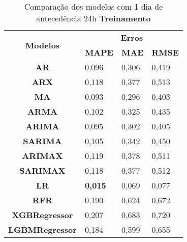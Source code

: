 	\begin{table}[H]
	\centering
	\caption{Comparação dos modelos com 1 dia de antecedência 24h \textbf{Treinamento} }\label{tb:1-24trn}
	\begin{tabular}{@{}clll@{}}
		\toprule
		\multirow{2}{*}{\textbf{Modelos}} & \multicolumn{3}{c}{\textbf{Erros}}                                                                       \\ \cmidrule(l){2-4} 
		& \multicolumn{1}{c}{\textbf{MAPE}} & \multicolumn{1}{c}{\textbf{MAE}} & \multicolumn{1}{c}{\textbf{RMSE}} \\ \hline
\textbf{AR}                       & 0,096                             & 0,306                            & 0,419                             \\
\textbf{ARX}                      & 0,118                             & 0,377                            & 0,513                             \\
\textbf{MA}                       & 0,093                             & 0,296                            & 0,403                             \\
\textbf{ARMA}                     & 0,102                             & 0,325                            & 0,435                             \\
\textbf{ARIMA}                    & 0,095                             & 0,302                            & 0,405                             \\
\textbf{SARIMA}                   & 0,105                             & 0,342                            & 0,450                             \\
\textbf{ARIMAX}                   & 0,119                             & 0,378                            & 0,511                             \\
\textbf{SARIMAX}                  & 0,118                             & 0,377                            & 0,512                             \\
\textbf{LR}                       & \textbf{0,015}                             & 0,069                            & 0,077                             \\
\textbf{RFR}                      & 0,190                             & 0,624                            & 0,672                             \\
\textbf{XGBRegressor}             & 0,207                             & 0,683                            & 0,720                             \\
\textbf{LGBMRegressor}            & 0,184                             & 0,599                            & 0,655                             \\ \bottomrule
	\end{tabular}

\end{table}


